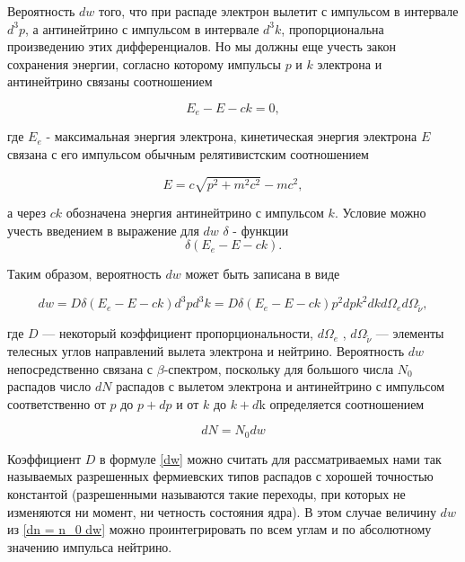 \documentclass[a4paper, 12pt]{article}%
\begin{document}
Вероятность $ dw $ того, что при распаде электрон вылетит с импульсом в интервале $d^3p$, а антинейтрино с импульсом в интервале $d^3k$, пропорциональна произведению этих дифференциалов. Но мы должны еще учесть закон сохранения энергии, согласно которому импульсы $ p $ и $ k $ электрона и антинейтрино связаны соотношением

\begin{equation}
E_e - E - ck = 0,
\end{equation}

где $E_e$ - максимальная энергия электрона, кинетическая энергия электрона $ E $ связана с его импульсом обычным релятивистским соотношением

\begin{equation}
E = c\sqrt{p^2 + m^2c^2} - mc^2,
\end{equation}

а через $ ck $ обозначена энергия антинейтрино с импульсом $ k $. Условие можно учесть введением в выражение для $ dw $ $\delta$ - функции
\begin{equation}
\delta (E_e - E - ck).
\end{equation}

Таким образом, вероятность $ dw $ может быть записана в виде

\begin{equation}\label{dw}
dw = D \delta (E_e - E - ck)d^3 p d^3 k = D \delta (E_e - E - ck)p^2dpk^2dkd{\Omega}_ed{\Omega}_{\widetilde{\nu}},
\end{equation}

где $ D $ --- некоторый коэффициент пропорциональности, $d\Omega_e$ , $d\Omega_{\widetilde{\nu}}$ --- элементы телесных углов направлений вылета электрона и нейтрино. Вероятность $ dw $ непосредственно связана с $\beta$-спектром, поскольку для большого числа $N_0$ распадов число $dN$ распадов с вылетом электрона и антинейтрино с импульсом соответственно от $ p $ до $ p + dp $ и от
$ k $ до $ k + d $k определяется соотношением

\begin{equation}\label{dn = n_0 dw}
dN = N_0 dw  
\end{equation}

Коэффициент $ D $ в формуле \eqref{dw} можно считать для рассматриваемых нами так называемых разрешенных фермиевских типов распадов с хорошей точностью константой (разрешенными называются такие переходы, при которых не изменяются ни момент, ни четность состояния ядра). В этом случае величину $ dw $ из \eqref{dn = n_0 dw} можно проинтегрировать по всем углам и по абсолютному значению импульса нейтрино.
\end{document}
